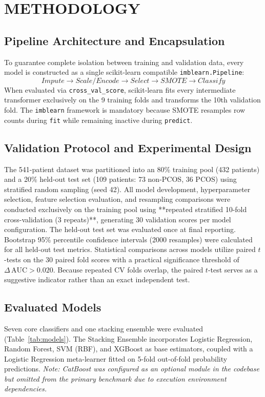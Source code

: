 \documentclass[10pt,twocolumn,a4paper]{article}
\begin{document}
\section{METHODOLOGY}

\subsection{Pipeline Architecture and Encapsulation}
To guarantee complete isolation between training and validation data, every model is constructed as a single
scikit-learn compatible \texttt{imblearn.Pipeline}:
\[
\textit{Impute} \!\to\! \textit{Scale/Encode} \!\to\! \textit{Select} \!\to\! \textit{SMOTE} \!\to\! \textit{Classify}
\]
When evaluated via \texttt{cross\_val\_score}, scikit-learn fits every intermediate transformer exclusively on the 9
training folds and transforms the 10th validation fold.  The \texttt{imblearn} framework is mandatory because SMOTE
resamples row counts during \texttt{fit} while remaining inactive during \texttt{predict}.

\subsection{Validation Protocol and Experimental Design}
The 541-patient dataset was partitioned into an 80\% training pool (432 patients) and a 20\% held-out test set
(109 patients: 73 non-PCOS, 36 PCOS) using stratified random sampling (seed 42).
All model development, hyperparameter selection, feature selection evaluation, and resampling comparisons were conducted
exclusively on the training pool using **repeated stratified 10-fold cross-validation (3 repeats)**, generating 30 validation
scores per model configuration.  The held-out test set was evaluated once at final reporting.
Bootstrap 95\% percentile confidence intervals (2000 resamples) were calculated for all held-out test metrics.
Statistical comparisons across models utilize paired $t$-tests on the 30 paired fold scores with a practical significance threshold
of $\Delta\,\text{AUC} > 0.020$.  Because repeated CV folds overlap, the paired $t$-test serves as a suggestive indicator rather
than an exact independent test.

\subsection{Evaluated Models}
Seven core classifiers and one stacking ensemble were evaluated (Table~\ref{tab:models}).
The Stacking Ensemble incorporates Logistic Regression, Random Forest, SVM (RBF), and XGBoost as base estimators,
coupled with a Logistic Regression meta-learner fitted on 5-fold out-of-fold probability predictions.
\textit{Note: CatBoost was configured as an optional module in the codebase but omitted from the primary benchmark due to execution environment dependencies.}
\end{document}
